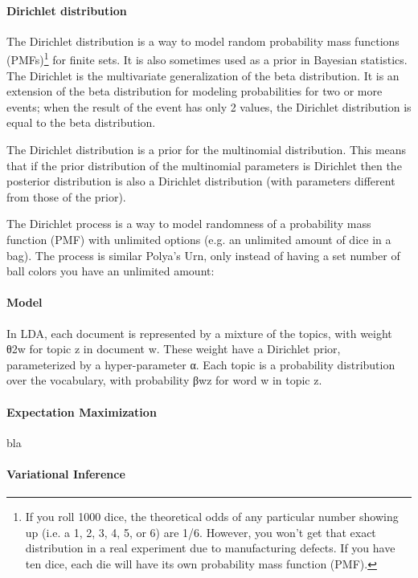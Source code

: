 \documentclass[12pt]{report}
\begin{document}
\paragraph{Dirichlet distribution}


The Dirichlet distribution is a way to model random probability mass functions (PMFs)\footnote{If you roll 1000 dice, the theoretical odds of any particular number showing up (i.e. a 1, 2, 3, 4, 5, or 6) are 1/6. 
However, you won’t get that exact distribution in a real experiment due to manufacturing defects. 
If you have ten dice, each die will have its own probability mass function (PMF).} for finite sets. 
It is also sometimes used as a prior in Bayesian statistics. 
The Dirichlet is the multivariate generalization of the beta distribution. 
It is an extension of the beta distribution for modeling probabilities for two or more events; 
when the result of the event has only 2 values, the Dirichlet distribution is equal to the beta distribution.


The Dirichlet distribution is a prior for the multinomial distribution. 
This means that if the prior distribution of the multinomial parameters is Dirichlet then the posterior distribution is also a Dirichlet distribution (with parameters different from those of the prior).

The Dirichlet process is a way to model randomness of a probability mass function (PMF) with unlimited options (e.g. an unlimited amount of dice in a bag). 
The process is similar Polya’s Urn, only instead of having a set number of ball colors you have an unlimited amount:


\paragraph{Model}


In LDA, each document is represented by a mixture of the topics, with weight θ2w for topic z in document w. 
These weight have a Dirichlet prior, parameterized by a hyper-parameter α. 
Each topic is a probability distribution over the vocabulary, with probability βwz for word w in topic z.


\paragraph{Expectation Maximization}


bla


\paragraph{Variational Inference}
\end{document}
